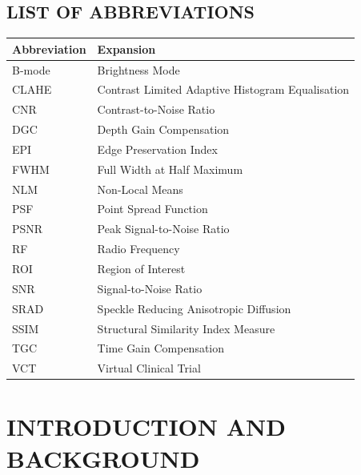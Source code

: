 \documentclass[12pt,a4paper,oneside]{report}
\begin{document}
\clearpage
\listoffigures
{}

\clearpage
\begingroup
\let\clearpage\relax
\listoftables
{}
\vspace{10pt}

\section*{LIST OF ABBREVIATIONS}
\endgroup

\begin{center}\small
\begin{tabular}{L{2.8cm} L{8.6cm}}
\toprule
\textbf{Abbreviation} & \textbf{Expansion}\\
\midrule
B-mode  & Brightness Mode\\
CLAHE   & Contrast Limited Adaptive Histogram Equalisation\\
CNR     & Contrast-to-Noise Ratio\\
DGC     & Depth Gain Compensation\\
EPI     & Edge Preservation Index\\
FWHM    & Full Width at Half Maximum\\
NLM     & Non-Local Means\\
PSF     & Point Spread Function\\
PSNR    & Peak Signal-to-Noise Ratio\\
RF      & Radio Frequency\\
ROI     & Region of Interest\\
SNR     & Signal-to-Noise Ratio\\
SRAD    & Speckle Reducing Anisotropic Diffusion\\
SSIM    & Structural Similarity Index Measure\\
TGC     & Time Gain Compensation\\
VCT     & Virtual Clinical Trial\\
\bottomrule
\end{tabular}
\end{center}

\clearpage
{}
\setcounter{page}{1}

\chapter{INTRODUCTION AND BACKGROUND}
\label{ch:intro}
\end{document}
